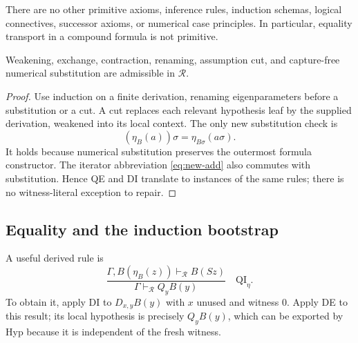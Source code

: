 There are no other primitive axioms, inference rules, induction schemas,
logical connectives, successor axioms, or numerical case principles.
In particular, equality transport in a compound formula is not primitive.

\begin{lemma}
\label{lem:new-structural}
Weakening, exchange, contraction, renaming, assumption cut, and capture-free
numerical substitution are admissible in $\mathcal R$.
\end{lemma}
\begin{proof}
Use induction on a finite derivation, renaming eigenparameters before a
substitution or a cut.  A cut replaces each relevant hypothesis leaf by the
supplied derivation, weakened into its local context.  The only new
substitution check is
\[
 (\eta_B(a))\sigma=\eta_{B\sigma}(a\sigma).
\]
It holds because numerical substitution preserves the outermost formula
constructor.  The iterator abbreviation \eqref{eq:new-add} also commutes with
substitution.  Hence QE and DI translate to instances of the same rules;
there is no witness-literal exception to repair.
\end{proof}

\subsection{Equality and the induction bootstrap}
\label{subsec:new-bootstrap}

A useful derived rule is
\begin{equation}
 \frac{\Gamma,B(\eta_B(z))\vdash_{\mathcal R}B(Sz)}
      {\Gamma\vdash_{\mathcal R}Q_yB(y)}
 \quad\mathrm{QI}_{\eta}.
 \label{eq:new-qi}
\end{equation}
To obtain it, apply DI to $D_{x,y}B(y)$ with $x$ unused and witness $0$.
Apply DE to this result; its local hypothesis is precisely $Q_yB(y)$, which
can be exported by Hyp because it is independent of the fresh witness.

